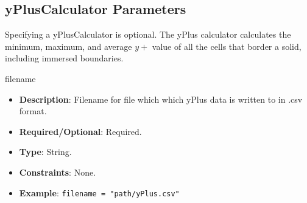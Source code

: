 \subsection*{yPlusCalculator Parameters}
Specifying a yPlusCalculator is optional. The yPlus calculator calculates the minimum, maximum, and average $y+$ value of all the cells that border a solid, including immersed boundaries.

filename
\vspace{\the\parameterListSpacing}
\begin{itemize}
    \item {\bf Description}: Filename for file which which yPlus data is written to in .csv format.
    \item {\bf Required/Optional}: Required.
    \item {\bf Type}: String.
    \item {\bf Constraints}: None.
    \item {\bf Example}: \lstinline!filename = "path/yPlus.csv"!
\end{itemize}
